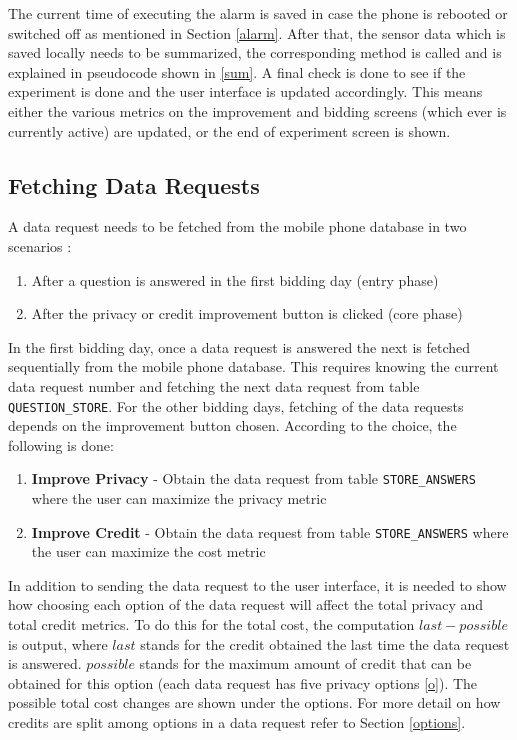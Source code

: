 The current time of executing the alarm is saved in case the phone is rebooted or switched off as mentioned in Section \ref{alarm}. After that, the sensor data which is saved locally
needs to be summarized, the corresponding method is called and is explained in pseudocode shown in \ref{sum}. A final check is done to see if the experiment is done and the user interface is updated accordingly. This means either the various metrics on the improvement and bidding screens (which ever is currently active) are updated, or
the end of experiment screen is shown.

\subsection{Fetching Data Requests} \label{data_req}
A data request needs to be fetched from the mobile phone database in two scenarios :

\begin{enumerate}
	\item After a question is answered in the first bidding day (entry phase)
	\item After the privacy or credit improvement button is clicked (core phase)
\end{enumerate}

In the first bidding day, once a data request is answered the next is fetched sequentially from the mobile phone database. This requires knowing the current data request number and fetching the next data request from table \texttt{QUESTION\_STORE}. For the other bidding days, fetching of the data requests depends on the improvement button chosen. According to the choice, the following is done:

\begin{enumerate}
	\item \textbf{Improve Privacy} - Obtain the data request from table \texttt{STORE\_ANSWERS} where the user can maximize the privacy metric
	\item \textbf{Improve Credit} - Obtain the data request from table \texttt{STORE\_ANSWERS} where the user can maximize the cost metric
\end{enumerate}

In addition to sending the data request to the user interface, it is needed to show how choosing each option of the data request will affect the total privacy and total credit metrics. To do this for the total cost, the computation $last-possible$ is output, where $last$ stands for the credit obtained the last time the data request is answered. $possible$ stands for the maximum amount of credit that can be obtained for this option (each data request has five privacy options \ref{o}). The possible total cost changes are shown under the options. For more detail on how credits are split among options in a data request refer to Section \ref{options}.

